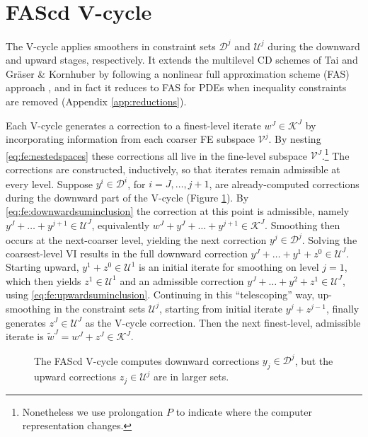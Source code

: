 \documentclass[letterpaper,final,12pt,reqno]{amsart}
\theoremstyle{cstyle}
\theoremstyle{cstyle*}
\theoremstyle{dstyle}
\numberwithin{equation}{section}
\numberwithin{figure}{section}
\numberwithin{table}{section}
\numberwithin{theorem}{section}
\begin{document}
\section{FAScd V-cycle} \label{sec:vcycle}

The V-cycle applies smoothers in constraint sets $\mathcal{D}^j$ and $\mathcal{U}^j$ during the downward and upward stages, respectively.  It extends the multilevel CD schemes of Tai \cite{Tai2003} and Gr\"aser \& Kornhuber \cite[Algorithm 4.7]{GraeserKornhuber2009} by following a nonlinear full approximation scheme (FAS) approach \cite{BrandtLivne2011}, and in fact it reduces to FAS for PDEs when inequality constraints are removed (Appendix \ref{app:reductions}).

Each V-cycle generates a correction to a finest-level iterate $w^J \in \mathcal{K}^J$ by incorporating information from each coarser FE subspace $\mathcal{V}^j$.  By nesting \eqref{eq:fe:nestedspaces} these corrections all live in the fine-level subspace $\mathcal{V}^J$.\footnote{Nonetheless we use prolongation $P$ to indicate where the computer representation changes.}  The corrections are constructed, inductively, so that iterates remain admissible at every level.  Suppose $y^i \in \mathcal{D}^i$, for $i=J,\dots,j+1$, are already-computed corrections during the downward part of the V-cycle (Figure \ref{fig:fascdvcycle}).  By \eqref{eq:fe:downwardsuminclusion} the correction at this point is admissible, namely $y^J + \dots + y^{j+1} \in \mathcal{U}^J$, equivalently $w^J + y^J + \dots + y^{j+1} \in \mathcal{K}^J$.  Smoothing then occurs at the next-coarser level, yielding the next correction $y^j \in \mathcal{D}^j$.  Solving the coarsest-level VI results in the full downward correction $y^J + \dots + y^1 + z^0 \in \mathcal{U}^J$.  Starting upward, $y^1 + z^0 \in \mathcal{U}^1$ is an initial iterate for smoothing on level $j=1$, which then yields $z^1 \in \mathcal{U}^1$ and an admissible correction $y^J + \dots + y^2 + z^1 \in \mathcal{U}^J$, using \eqref{eq:fe:upwardsuminclusion}.  Continuing in this ``telescoping'' way, up-smoothing in the constraint sets $\mathcal{U}^j$, starting from initial iterate $y^j+z^{j-1}$, finally generates $z^J\in \mathcal{U}^J$ as the V-cycle correction.  Then the next finest-level, admissible iterate is $\tilde{w}^J = w^J + z^J \in \mathcal{K}^J$.

\begin{figure}[ht]
\begin{center}

\end{center}
\caption{The FAScd V-cycle computes downward corrections $y_j \in \mathcal{D}^j$, but the upward corrections $z_j\in\mathcal{U}^j$ are in larger sets.}
\label{fig:fascdvcycle}
\end{figure}
\end{document}
